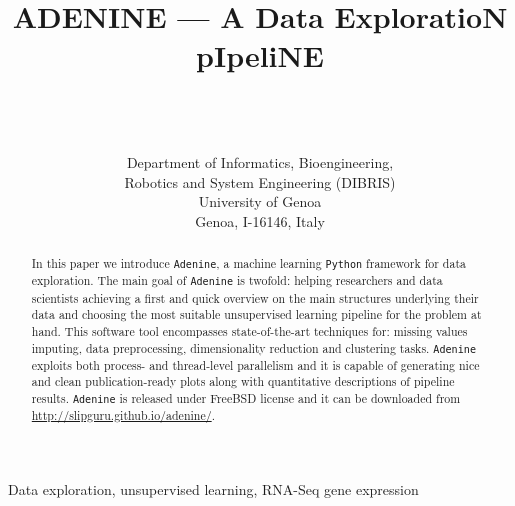 \documentclass[twoside,11pt]{article}
\makeatletter
\newcommand{\ade}{\texttt{Adenine}\@\xspace}
\newcommand{\py}{\texttt{Python}\@\xspace}
\makeatother
\begin{document}
\title{ADENINE --- A Data ExploratioN pIpeliNE}

\author{ \\
 \\
 \\[1em]
\addr Department of Informatics, Bioengineering, \\Robotics and System Engineering (DIBRIS)\\
     University of Genoa\\
     Genoa, I-16146, Italy}



\maketitle

\begin{abstract}

In this paper we introduce \ade, a machine learning \py framework for data exploration. The main goal of \ade{} is twofold: helping researchers and data scientists achieving a first and quick overview on the main structures underlying their data and choosing the most suitable unsupervised learning pipeline for the problem at hand. This software tool encompasses state-of-the-art techniques for: missing values imputing, data preprocessing, dimensionality reduction and clustering tasks.
\ade exploits both process- and thread-level parallelism and it is capable of generating nice and clean publication-ready plots along with quantitative descriptions of pipeline results. \ade is released under FreeBSD license and it can be downloaded from \href{http://slipguru.github.io/adenine/}{http://slipguru.github.io/adenine/}.

\end{abstract}

\begin{keywords}
Data exploration, unsupervised learning, RNA-Seq gene expression
\end{keywords}
\end{document}
